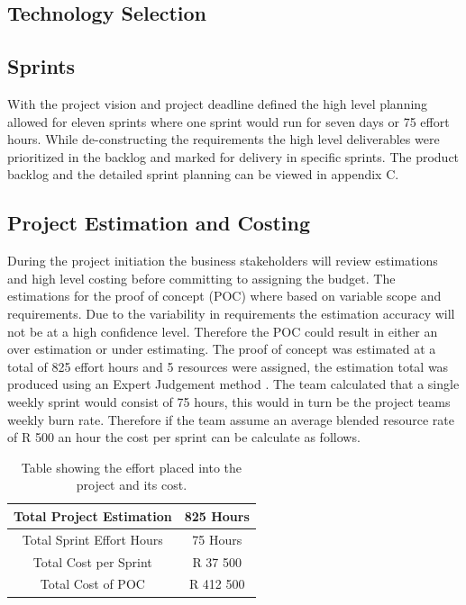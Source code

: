 \documentclass[12pt]{witseiepaper}
\begin{document}
\subsection{Technology Selection}


\subsection{Sprints}
With the project vision and project deadline defined the high level planning allowed for eleven sprints \cite{ExpertJudgement} where one sprint would run for seven days or 75 effort hours. While de-constructing the requirements the high level deliverables were prioritized in the backlog and marked for delivery in specific sprints. The product backlog and the detailed sprint planning can be viewed in appendix C.


\subsection{Project Estimation and Costing}
During the project initiation the business stakeholders will review estimations and high level costing before committing to assigning the budget. \cite{ExpertJudgement} The estimations for the proof of concept (POC) where based on variable scope and requirements. Due to the variability in requirements the estimation accuracy will not be at a high confidence level. Therefore the POC could result in either an over estimation or under estimating. The proof of concept was estimated at a total of 825 effort hours and 5 resources were assigned, the estimation total was produced using an Expert Judgement method \cite{ExpertJudgement}. The team calculated that a single weekly sprint would consist of 75 hours, this would in turn be the project teams weekly burn rate. Therefore if the team assume an average blended resource rate of R 500 an hour the cost per sprint can be calculate as follows.

\begin{table}[htb] \caption{Table showing the effort placed into the project and its cost.} \label{tbl:cost} 
    \begin{center}
  \begin{tabular}
     {|c|c|} %
    \hline Total Project Estimation &825 Hours\\
    \hline Total Sprint Effort Hours &75 Hours\\
    \hline Total Cost per Sprint &R 37 500\\
    \hline Total Cost of POC & R 412 500 \\
    \hline 
  \end{tabular}
      \end{center}
\end{table}
\end{document}
